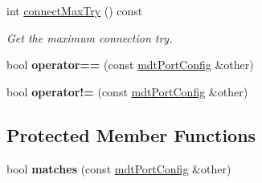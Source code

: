 \begin{DoxyCompactItemize}
int \hyperlink{classmdt_port_config_a98aa42afacba9bfe28d3f02a6b849f60}{connectMaxTry} () const 
\begin{DoxyCompactList}\small\item\em Get the maximum connection try. \end{DoxyCompactList}\item 
\hypertarget{classmdt_port_config_a639c71f90cfeb7e2160ad90e9775054b}{
bool {\bfseries operator==} (const \hyperlink{classmdt_port_config}{mdtPortConfig} \&other)}
\label{classmdt_port_config_a639c71f90cfeb7e2160ad90e9775054b}

\item 
\hypertarget{classmdt_port_config_a5a539c86934d41306a3ed18a8292457d}{
bool {\bfseries operator!=} (const \hyperlink{classmdt_port_config}{mdtPortConfig} \&other)}
\label{classmdt_port_config_a5a539c86934d41306a3ed18a8292457d}

\end{DoxyCompactItemize}
\subsection*{Protected Member Functions}
\begin{DoxyCompactItemize}
\item 
\hypertarget{classmdt_port_config_a6372ebc36d4476899e2274299ae5799d}{
bool {\bfseries matches} (const \hyperlink{classmdt_port_config}{mdtPortConfig} \&other)}
\label{classmdt_port_config_a6372ebc36d4476899e2274299ae5799d}

\end{DoxyCompactItemize}
